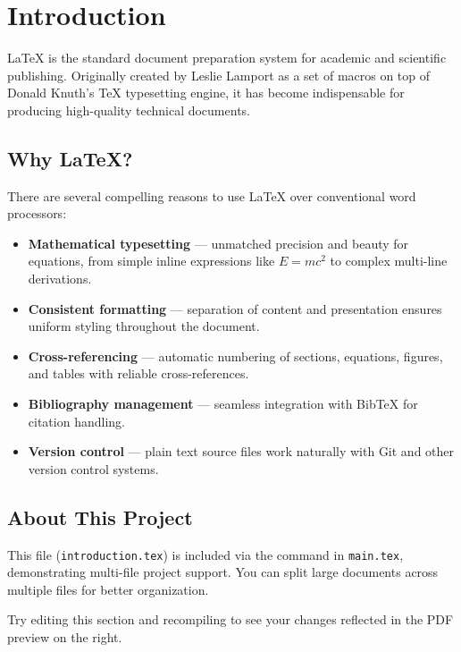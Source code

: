 \section{Introduction}
\label{sec:introduction}

\LaTeX{} is the standard document preparation system for academic and scientific
publishing. Originally created by Leslie Lamport as a set of macros on top of
Donald Knuth's \TeX{} typesetting engine, it has become indispensable for
producing high-quality technical documents.

\subsection{Why \LaTeX{}?}

There are several compelling reasons to use \LaTeX{} over conventional
word processors:

\begin{itemize}
  \item \textbf{Mathematical typesetting} --- unmatched precision and beauty
    for equations, from simple inline expressions like $E = mc^2$ to complex
    multi-line derivations.
  \item \textbf{Consistent formatting} --- separation of content and
    presentation ensures uniform styling throughout the document.
  \item \textbf{Cross-referencing} --- automatic numbering of sections,
    equations, figures, and tables with reliable cross-references.
  \item \textbf{Bibliography management} --- seamless integration with
    Bib\TeX{} for citation handling.
  \item \textbf{Version control} --- plain text source files work naturally
    with Git and other version control systems.
\end{itemize}

\subsection{About This Project}

This file (\texttt{introduction.tex}) is included via the \verb||
command in \texttt{main.tex}, demonstrating multi-file project support.
You can split large documents across multiple files for better organization.

Try editing this section and recompiling to see your changes reflected in the
PDF preview on the right.
